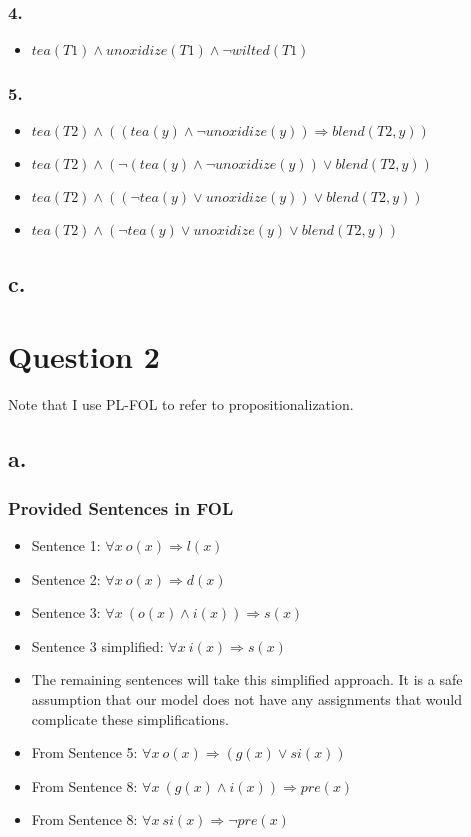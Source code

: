\documentclass[11pt]{article}
\begin{document}
\subsubsection{4.}
\label{sec:org4c12128}
\begin{itemize}
\item \(tea(T1) \land unoxidize(T1) \land \lnot wilted(T1)\)
\end{itemize}
\subsubsection{5.}
\label{sec:org6b89032}
\begin{itemize}
\item \(tea(T2) \land ((tea(y) \land \lnot unoxidize(y)) \Rightarrow blend(T2,y))\)
\item \(tea(T2) \land (\lnot(tea(y) \land \lnot unoxidize(y)) \lor blend(T2,y))\)
\item \(tea(T2) \land ((\lnot tea(y) \lor unoxidize(y)) \lor blend(T2,y))\)
\item \(tea(T2) \land (\lnot tea(y) \lor unoxidize(y) \lor blend(T2,y))\)
\end{itemize}
\subsection{c.}
\label{sec:org9b00939}
\section{Question 2}
\label{sec:org8440369}
Note that I use PL-FOL to refer to propositionalization.
\subsection{a.}
\label{sec:orgff5b2dc}
\subsubsection{Provided Sentences in FOL}
\label{sec:org1c5b150}
\begin{itemize}
\item Sentence 1: \(\forall x \: o(x) \Rightarrow l(x)\)
\item Sentence 2: \(\forall x \: o(x) \Rightarrow d(x)\)
\item Sentence 3: \(\forall x \: (o(x) \land i(x)) \Rightarrow s(x)\)
\item Sentence 3 simplified: \(\forall x \: i(x) \Rightarrow s(x)\)
\item The remaining sentences will take this simplified approach. It is a safe assumption that our model does not have any assignments that would complicate these simplifications.
\item From Sentence 5: \(\forall x \: o(x) \Rightarrow (g(x) \lor si(x))\)
\item From Sentence 8: \(\forall x \: (g(x) \land i(x)) \Rightarrow pre(x)\)
\item From Sentence 8: \(\forall x \: si(x) \Rightarrow \lnot pre(x)\)
\end{itemize}
\end{document}
